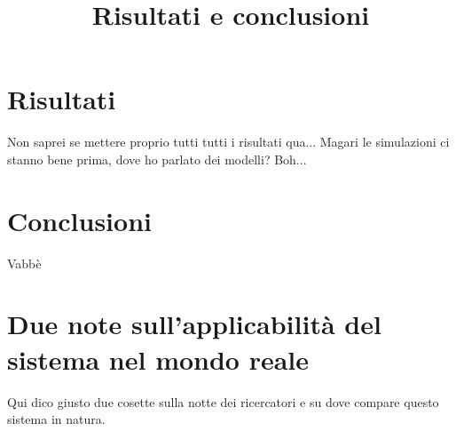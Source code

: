 \title{Risultati e conclusioni}
\maketitle
\label{sec:conclusions}



\section{Risultati}
Non saprei se mettere proprio tutti tutti i risultati qua... Magari le simulazioni ci stanno bene prima, dove ho parlato dei modelli? Boh...

\section{Conclusioni}
Vabbè

\section{Due note sull'applicabilità del sistema nel mondo reale}
Qui dico giusto due cosette sulla notte dei ricercatori e su dove compare questo sistema in natura.